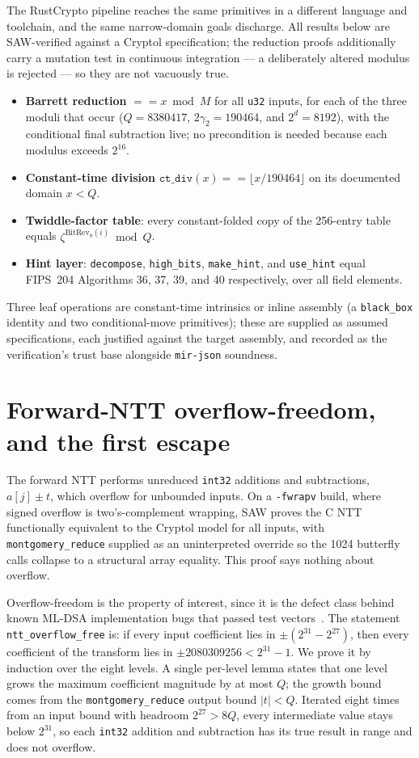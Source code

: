 \documentclass[11pt]{article}
\newcommand{\code}[1]{\texttt{#1}}
\begin{document}
The RustCrypto pipeline reaches the same primitives in a different language and toolchain, and the same
narrow-domain goals discharge. All results below are SAW-verified against a Cryptol specification; the
reduction proofs additionally carry a mutation test in continuous integration --- a deliberately altered
modulus is rejected --- so they are not vacuously true.
\begin{itemize}
  \item \textbf{Barrett reduction} $== x \bmod M$ for all \code{u32} inputs, for each of the three moduli
  that occur ($Q = 8380417$, $2\gamma_2 = 190464$, and $2^d = 8192$), with the conditional final
  subtraction live; no precondition is needed because each modulus exceeds $2^{16}$.
  \item \textbf{Constant-time division} $\code{ct\_div}(x) == \lfloor x / 190464 \rfloor$ on its
  documented domain $x < Q$.
  \item \textbf{Twiddle-factor table}: every constant-folded copy of the 256-entry table equals
  $\zeta^{\mathrm{BitRev}_8(i)} \bmod Q$.
  \item \textbf{Hint layer}: \code{decompose}, \code{high\_bits}, \code{make\_hint}, and
  \code{use\_hint} equal FIPS~204 Algorithms 36, 37, 39, and 40 respectively, over all field elements.
\end{itemize}
Three leaf operations are constant-time intrinsics or inline assembly (a \code{black\_box} identity and
two conditional-move primitives); these are supplied as assumed specifications, each justified against
the target assembly, and recorded as the verification's trust base alongside \code{mir-json} soundness.

\section{Forward-NTT overflow-freedom, and the first escape}\label{sec:ntt}

The forward NTT performs unreduced \code{int32} additions and subtractions, $a[j] \pm t$, which overflow
for unbounded inputs. On a \code{-fwrapv} build, where signed overflow is two's-complement wrapping, SAW
proves the C NTT functionally equivalent to the Cryptol model for all inputs, with \code{montgomery\_reduce}
supplied as an uninterpreted override so the 1024 butterfly calls collapse to a structural array
equality. This proof says nothing about overflow.

Overflow-freedom is the property of interest, since it is the defect class behind known ML-DSA
implementation bugs that passed test vectors~\cite{eprint1032}. The statement \code{ntt\_overflow\_free}
is: if every input coefficient lies in $\pm(2^{31} - 2^{27})$, then every coefficient of the transform
lies in $\pm 2080309256 < 2^{31} - 1$. We prove it by induction over the eight levels. A single per-level
lemma states that one level grows the maximum coefficient magnitude by at most $Q$; the growth bound
comes from the \code{montgomery\_reduce} output bound $|t| < Q$. Iterated eight times from an input bound
with headroom $2^{27} > 8Q$, every intermediate value stays below $2^{31}$, so each \code{int32}
addition and subtraction has its true result in range and does not overflow.
\end{document}
